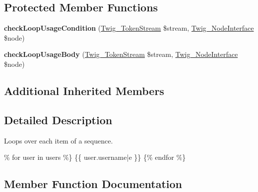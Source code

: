 \subsection*{Protected Member Functions}
\begin{DoxyCompactItemize}
\item 
\hypertarget{class_twig___token_parser___for_a6f6d691fab820b69b3c6b181ba234b86}{}{\bfseries check\+Loop\+Usage\+Condition} (\hyperlink{class_twig___token_stream}{Twig\+\_\+\+Token\+Stream} \$stream, \hyperlink{interface_twig___node_interface}{Twig\+\_\+\+Node\+Interface} \$node)\label{class_twig___token_parser___for_a6f6d691fab820b69b3c6b181ba234b86}

\item 
\hypertarget{class_twig___token_parser___for_ab992fbd424a4b456b999d5762da72276}{}{\bfseries check\+Loop\+Usage\+Body} (\hyperlink{class_twig___token_stream}{Twig\+\_\+\+Token\+Stream} \$stream, \hyperlink{interface_twig___node_interface}{Twig\+\_\+\+Node\+Interface} \$node)\label{class_twig___token_parser___for_ab992fbd424a4b456b999d5762da72276}

\end{DoxyCompactItemize}
\subsection*{Additional Inherited Members}


\subsection{Detailed Description}
Loops over each item of a sequence.


\begin{DoxyPre}

\begin{DoxyItemize}
\item 
\end{DoxyItemize}\% for user in users \%\}
   \{\{ user.username|e \}\}
 \{\% endfor \%\}

\end{DoxyPre}
 

\subsection{Member Function Documentation}
\hypertarget{class_twig___token_parser___for_ab86ba36154b20e6bbfa3ba705f12f9d6}{}
